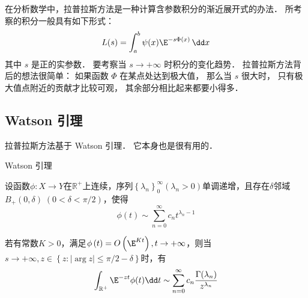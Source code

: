 

在分析数学中，拉普拉斯方法是一种计算含参数积分的渐近展开式的办法． 所考察的积分一般具有如下形式：
\begin{equation}\label{LapAsm_eq1}
L(s)=\int_a^b\psi(x)\E^{-s\Phi(x)}\,\dd x
\end{equation}
其中 $s$ 是正的实参数． 要考察当 $s\to+\infty$ 时积分的变化趋势． 拉普拉斯方法背后的想法很简单： 如果函数 $\Phi$ 在某点处达到极大值， 那么当 $s$ 很大时， 只有极大值点附近的贡献才比较可观， 其余部分相比起来都要小得多．

\subsection{Watson 引理}
拉普拉斯方法基于 Watson 引理． 它本身也是很有用的．

\begin{lemma}{Watson 引理}

设函数$\phi:X\to Y$在$\mathbb{R}^+$上连续，序列$\left\{\lambda_n\right\}_0^\infty\left(\lambda_n>0\right)$单调递增，且存在$\delta$邻域$B_{+}(0,\delta)\;(0<\delta<\pi/2)$，使得
\begin{equation}\label{LapAsm_eq2}
  \phi\left(t\right)\sim\sum_{n=0}^{\infty}{c_nt^{\lambda_n-1}}
\end{equation}

若有常数$K>0$，满足$\phi\left(t\right)=O\left(\E^{Kt}\right),t\to+\infty$，则当$s\to+\infty,z\in{\left\{z:\left|\arg{z}\right|\le\pi/2-\delta\right\}}$时，有
\begin{equation}\label{LapAsm_eq3}
\int_{\mathbb{R}^+}\E^{-zt}\phi(t)\dd t\sim\sum_{n=0}^{\infty}{c_n}\frac{\Gamma(\lambda_n)}{z^{\lambda_n}}  
\end{equation}
\end{lemma}

